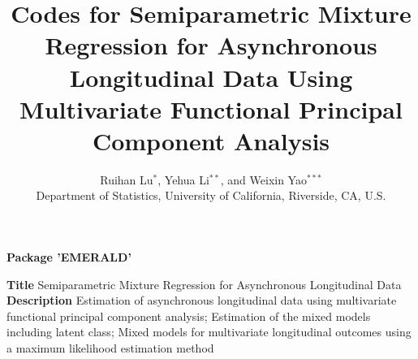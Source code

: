 \documentclass[useAMS,usenatbib,referee]{article}
\title[Semiparametric Mixture Regression for Asynchronous Longitudinal Data]{Codes for Semiparametric Mixture Regression for Asynchronous Longitudinal Data Using Multivariate Functional Principal Component Analysis}
\author{Ruihan Lu$^*$\email{rlu014@ucr.edu},
Yehua Li$^{**}$\email{yehua.li@ucr.edu}, and
Weixin Yao$^{***}$\email{weixin.yao@ucr.edu} \\
Department of Statistics, University of California, Riverside, CA, U.S.}
\begin{document}
\maketitle

\begin{titlepage}
   \begin{center}
       \vspace*{1cm}

       \textbf{\Large{Package 'EMERALD'}}

       \vspace{0.5cm}
\begin{FlushLeft}
\textbf{Title} Semiparametric Mixture Regression for Asynchronous Longitudinal Data
\\
\textbf{Description} Estimation of asynchronous longitudinal data using multivariate functional principal component analysis; Estimation of the mixed models including latent class; Mixed models for multivariate longitudinal outcomes using a maximum likelihood estimation method

\end{FlushLeft}
            
            
   \end{center}
\end{titlepage}


\end{document}
